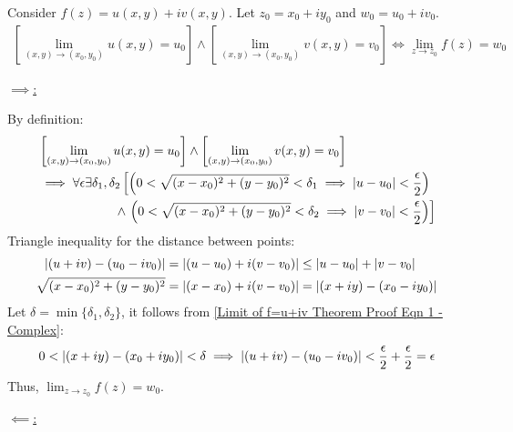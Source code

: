 \documentclass[12pt, english]{book}
\makeatletter
\renewenvironment{proof}[1][\proofname]{\par
	\pushQED{\qed}%
	\normalfont \topsep6\p@\@plus6\p@\relax
	\list{}{%
		\settowidth{\leftmargin}{\itshape\proofname:\hskip\labelsep}%
		\setlength{\labelwidth}{0pt}%
		\setlength{\itemindent}{-\leftmargin}%
	}%
	\item[\hskip\labelsep\itshape#1\@addpunct{:}]\ignorespaces
	}{ \popQED\endlist\@endpefalse}
\makeatother
\begin{document}
	\begin{theorem}
		\label{Limit of f=u+iv Theorem - Complex}
		Consider $f(z) = u(x, y) + iv(x,y)$. Let $z_0 = x_0 + iy_0$ and $w_0 = u_0 + iv_0$.
		\begin{align*}
			\left[\lim_{(x,y) \rightarrow (x_0, y_0)} u(x,y) = u_0 \right] \land
			\left[\lim_{(x,y) \rightarrow (x_0, y_0)} v(x,y) = v_0 \right]
			\iff
			\lim_{z \rightarrow z_0} f(z) = w_0
		\end{align*}
	\end{theorem}
	\begin{proof}
		\underline{$\implies$:}
		
		By definition: 
		\begin{align}
			\label{Limit of f=u+iv Theorem Proof Eqn 1 - Complex}
			&\left[\lim_{(x,y) \rightarrow (x_0, y_0)} u(x,y) = u_0 \right] \land
			 \left[\lim_{(x,y) \rightarrow (x_0, y_0)} v(x,y) = v_0 \right] \\ \nonumber
			&\implies \forall \epsilon \exists \delta_1, \delta_2
			 \left[\left(0< \sqrt{(x-x_0)^2 + (y-y_0)^2} < \delta_1 \implies \abs{u-u_0} < \frac{\epsilon}{2}\right) \right.\\ \nonumber
			&\qquad \qquad \qquad \land \left.
			 \left(0< \sqrt{(x-x_0)^2 + (y-y_0)^2} < \delta_2 \implies \abs{v-v_0} < \frac{\epsilon}{2}\right)
			 \right]
		\end{align}
		Triangle inequality for the distance between points:
		\begin{align*}
			\abs{(u+iv) - (u_0 - iv_0)} &= \abs{(u-u_0) + i(v-v_0)} \leq \abs{u-u_0} + \abs{v-v_0} \\
			\sqrt{(x-x_0)^2 + (y-y_0)^2} &= \abs{(x-x_0) + i(v-v_0)} = \abs{(x+iy) - (x_0 - iy_0)}
		\end{align*}
		Let $\delta = \min\{\delta_1, \delta_2\}$, it follows from 
		\cref{Limit of f=u+iv Theorem Proof Eqn 1 - Complex}: 
		$$0 < \abs{(x+iy) - (x_0 + iy_0)} < \delta 
			\implies \abs{(u+iv)-(u_0 - iv_0)} < \frac{\epsilon}{2} + \frac{\epsilon}{2} = \epsilon$$
		Thus, $\lim_{z \rightarrow z_0} f(z) = w_0$.
		
		\underline{$\impliedby$:}
		

\end{proof}
\end{document}
